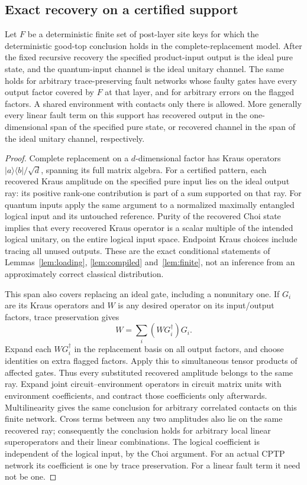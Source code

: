 \subsection{Exact recovery on a certified support}
\begin{lemma}\label{lem:fault-span}
Let $F$ be a deterministic finite set of post-layer site keys for which the deterministic good-top conclusion holds in the complete-replacement model. After the fixed recursive recovery the specified product-input output is the ideal pure state, and the quantum-input channel is the ideal unitary channel. The same holds for arbitrary trace-preserving fault networks whose faulty gates have every output factor covered by $F$ at that layer, and for arbitrary errors on the flagged factors. A shared environment with contacts only there is allowed. More generally every linear fault term on this support has recovered output in the one-dimensional span of the specified pure state, or recovered channel in the span of the ideal unitary channel, respectively.
\end{lemma}
\begin{proof}
Complete replacement on a $d$-dimensional factor has Kraus operators $|a\rangle\langle b|/\sqrt d$, spanning its full matrix algebra. For a certified pattern, each recovered Kraus amplitude on the specified pure input lies on the ideal output ray: its positive rank-one contribution is part of a sum supported on that ray. For quantum inputs apply the same argument to a normalized maximally entangled logical input and its untouched reference. Purity of the recovered Choi state implies that every recovered Kraus operator is a scalar multiple of the intended logical unitary, on the entire logical input space. Endpoint Kraus choices include tracing all unused outputs. These are the exact conditional statements of Lemmas~\ref{lem:loading}, \ref{lem:compiled} and~\ref{lem:finite}, not an inference from an approximately correct classical distribution.

This span also covers replacing an ideal gate, including a nonunitary one. If $G_i$ are its Kraus operators and $W$ is any desired operator on its input/output factors, trace preservation gives
\[
 W=\sum_i(WG_i^\dagger)G_i.
\]
Expand each $WG_i^\dagger$ in the replacement basis on all output factors, and choose identities on extra flagged factors. Apply this to simultaneous tensor products of affected gates. Thus every substituted recovered amplitude belongs to the same ray. Expand joint circuit--environment operators in circuit matrix units with environment coefficients, and contract those coefficients only afterwards. Multilinearity gives the same conclusion for arbitrary correlated contacts on this finite network. Cross terms between any two amplitudes also lie on the same recovered ray; consequently the conclusion holds for arbitrary local linear superoperators and their linear combinations. The logical coefficient is independent of the logical input, by the Choi argument. For an actual CPTP network its coefficient is one by trace preservation. For a linear fault term it need not be one.
\end{proof}

